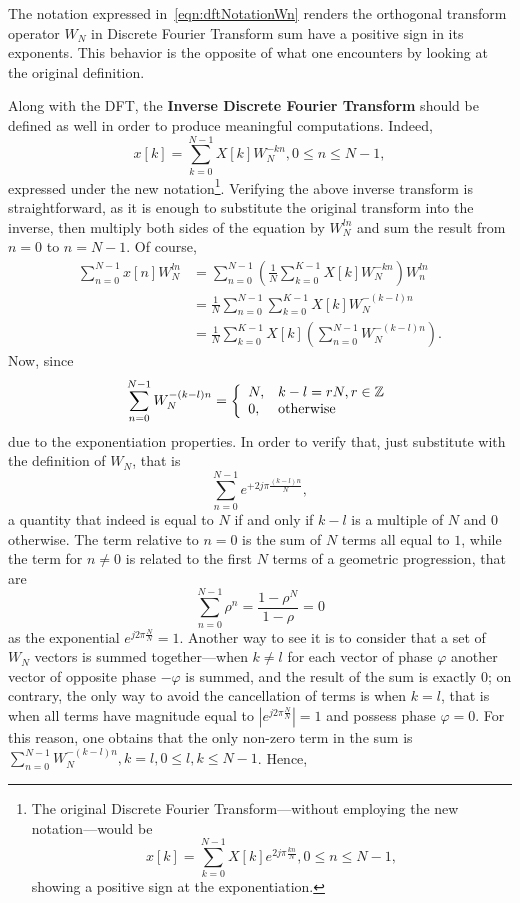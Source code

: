 \documentclass[\documentfontsize, twocolumn]{\classname}
\begin{document}
The notation expressed in~\ref{eqn:dftNotationWn} renders the orthogonal transform operator $W_N$ in Discrete Fourier Transform sum have a positive sign in its exponents. This behavior is the opposite of what one encounters by looking at the original definition.

Along with the DFT, the \textbf{Inverse Discrete Fourier Transform} should be defined as well in order to produce meaningful computations. Indeed,
\begin{equation}\label{eqn:inverseDiscreteFourierTransformWn}
    x[k] = \sum_{k=0}^{N-1} X[k] W_N^{-kn}, 0 \leq n \leq N-1,
\end{equation}
expressed under the new notation\footnote{
    The original Discrete Fourier Transform---without employing the new notation---would be 
    \[
        x[k] = \sum_{k=0}^{N-1} X[k] e^{2j\pi\frac{kn}{N}}, 0 \leq n \leq N-1,
    \]
    showing a positive sign at the exponentiation.
}.
Verifying the above inverse transform is straightforward, as it is enough to substitute the original transform into the inverse, then multiply both sides of the equation by $W_N^{ln}$ and sum the result from $n=0$ to $n=N-1$. Of course,
\begin{align*}
    \sum_{n=0}^{N-1} x[n] W_N^{ln}
    &= \sum_{n=0}^{N-1}\left(\frac 1 N\sum_{k=0}^{K-1} X[k] W_N^{-kn}\right)W_n^{ln}\\
    &= \frac 1 N \sum_{n=0}^{N-1}\sum_{k=0}^{K-1} X[k] W_N^{-(k-l)n}\\
    &= \frac 1 N \sum_{k=0}^{K-1} X[k] \left(\sum_{n=0}^{N-1}W_N^{-(k-l)n}\right).
\end{align*}
Now, since
\begin{equation}\label{eqn:dftWnProperty}
    \sum_{n=0}^{N-1}W_N^{-(k-l)n} = \left\{\begin{array}{ll} N, & k - l = rN, r \in \mathbb Z\\ 0, & \mbox{otherwise}\end{array}\right.
\end{equation}
due to the exponentiation properties. In order to verify that, just substitute with the definition of $W_N$, that is \[\sum_{n=0}^{N-1}e^{+2j\pi\frac{(k-l)n}{N}},\] a quantity that indeed is equal to $N$ if and only if $k-l$ is a multiple of $N$ and $0$ otherwise. The term relative to $n=0$ is the sum of $N$ terms all equal to $1$, while the term for $n\neq 0$ is related to the first $N$ terms of a geometric progression, that are \[\sum_{n=0}^{N-1}\rho^n = \frac{1-\rho^N}{1 - \rho} = 0\] as the exponential $e^{j2\pi\frac{N}{N}} = 1$. Another way to see it is to consider that a set of $W_N$ vectors is summed together---when $k\neq l$ for each vector of phase $\varphi$ another vector of opposite phase $-\varphi$ is summed, and the result of the sum is exactly $0$; on contrary, the only way to avoid the cancellation of terms is when $k = l$, that is when all terms have magnitude equal to $|e^{j2\pi\frac{N}{N}}| = 1$ and possess phase $\varphi = 0$. For this reason, one obtains that the only non-zero term in the sum is $\sum_{n=0}^{N-1} W_N^{-(k-l)n}, k=l, 0\leq l,k \leq N-1$. Hence,
\end{document}

